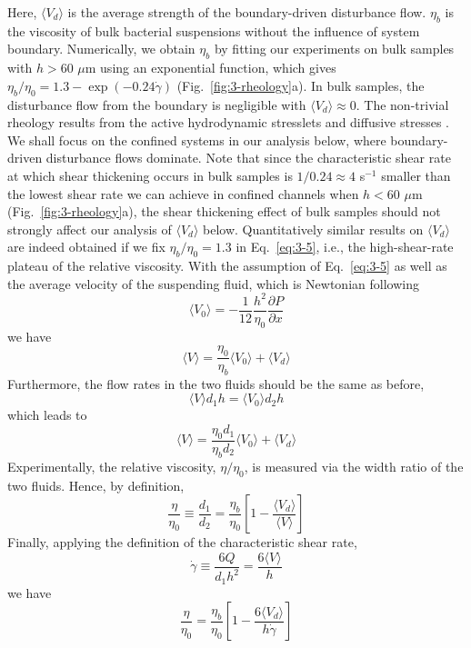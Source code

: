 Here, $\langle V_d \rangle$ is the average strength of the boundary-driven disturbance flow. $\eta_b$ is the viscosity of bulk bacterial suspensions without the influence of system boundary. Numerically, we obtain $\eta_b$ by fitting our experiments on bulk samples with $h > 60$ $\mu$m using an exponential function, which gives $\eta_b/\eta_0=1.3-\exp(-0.24\dot\gamma)$ (Fig.~\ref{fig:3-rheology}a). In bulk samples, the disturbance flow from the boundary is negligible with $\langle V_d \rangle \approx 0$.
The non-trivial rheology results from the active hydrodynamic stresslets and diffusive stresses \cite{Alonso-Matilla2016, Takatori2017}. We shall focus on the confined systems in our analysis below, where boundary-driven disturbance flows dominate. Note that since the characteristic shear rate at which shear thickening occurs in bulk samples is $1/0.24 \approx 4$ s$^{-1}$ smaller than the lowest shear rate we can achieve in confined channels when $h < 60$ $\mu$m (Fig.~\ref{fig:3-rheology}a), the shear thickening effect of bulk samples should not strongly affect our analysis of $\langle V_d \rangle$ below.
Quantitatively similar results on $\langle V_d \rangle$ are indeed obtained if we fix $\eta_b/\eta_0 = 1.3$ in Eq.~\ref{eq:3-5}, i.e.,
the high-shear-rate plateau of the relative viscosity. With the assumption of Eq.~\ref{eq:3-5} as well as the average velocity
of the suspending fluid, which is Newtonian following
\begin{equation}
  \label{eq:3-6}
  \langle V_0 \rangle = -\frac{1}{12}\frac{h^2}{\eta_0}\frac{\partial P}{\partial x}
\end{equation}
we have
\begin{equation}
  \label{eq:3-7}
  \langle V \rangle = \frac{\eta_0}{\eta_b} \langle V_0 \rangle + \langle V_d \rangle
\end{equation}
Furthermore, the flow rates in the two fluids should be the same as before,
$$
  \langle V \rangle d_1 h = \langle V_0 \rangle d_2 h
$$
which leads to
$$
\langle V \rangle = \frac{\eta_0d_1}{\eta_bd_2} \langle V_0 \rangle + \langle V_d \rangle
$$
Experimentally, the relative viscosity, $\eta/\eta_0$, is measured via the width ratio of the two fluids. Hence, by definition,
\begin{equation}
  \label{eq:3-8}
  \frac{\eta}{\eta_0} \equiv \frac{d_1}{d_2} = \frac{\eta_b}{\eta_0} \left[ 1 - \frac{\langle V_d \rangle}{\langle V \rangle}  \right]
\end{equation}
Finally, applying the definition of the characteristic shear rate,
$$
\dot\gamma \equiv \frac{6Q}{d_1h^2} = \frac{6\langle V \rangle}{h}
$$
we have
\begin{equation}
  \label{eq:3-9}
  \frac{\eta}{\eta_0} = \frac{\eta_b}{\eta_0} \left[ 1 - \frac{6\langle V_d \rangle}{h\dot\gamma}  \right]
\end{equation}


